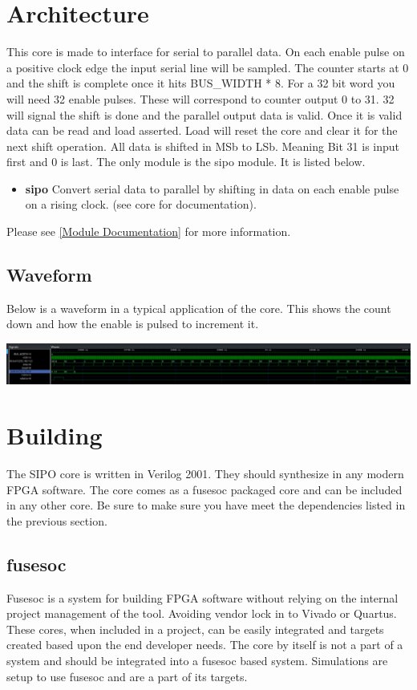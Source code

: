 \section{Architecture}
\par
This core is made to interface for serial to parallel data. On each enable pulse on a positive clock edge the input serial
line will be sampled. The counter starts at 0 and the shift is complete once it hits BUS\_WIDTH * 8. For a 32 bit word you will
need 32 enable pulses. These will correspond to counter output 0 to 31. 32 will signal the shift is done and the parallel output
data is valid. Once it is valid data can be read and load asserted. Load will reset the core and clear it for the next shift operation.
All data is shifted in MSb to LSb. Meaning Bit 31 is input first and 0 is last.
The only module is the sipo module. It is listed below.

\begin{itemize}
  \item \textbf{sipo} Convert serial data to parallel by shifting in data on each enable pulse on a rising clock. (see core for documentation).
\end{itemize}

Please see \ref{Module Documentation} for more information.

\subsection{Waveform}
Below is a waveform in a typical application of the core. This shows the count down and how the enable is pulsed to increment it.

\includegraphics[width=\textwidth]{src/diagrams/waveform.png}

\section{Building}

\par
The SIPO core is written in Verilog 2001. They should synthesize in any modern FPGA software. The core comes as a fusesoc packaged core and can be
included in any other core. Be sure to make sure you have meet the dependencies listed in the previous section.

\subsection{fusesoc}
\par
Fusesoc is a system for building FPGA software without relying on the internal project management of the tool. Avoiding vendor lock in to Vivado or Quartus.
These cores, when included in a project, can be easily integrated and targets created based upon the end developer needs. The core by itself is not a part of
a system and should be integrated into a fusesoc based system. Simulations are setup to use fusesoc and are a part of its targets.

